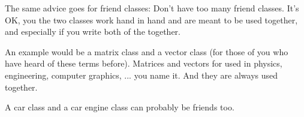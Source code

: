 The same advice goes for friend classes: Don't have too many friend
classes. It's OK, you the two classes work hand in hand and are meant
to be used together, and especially if you write both of the together.

An example would be a matrix class and a vector class (for those of you
who have heard of these terms before). Matrices and vectors for used in
physics, engineering, computer graphics, ... you name it. And they are
always used together.

A car class and a car engine class can probably be friends too.


